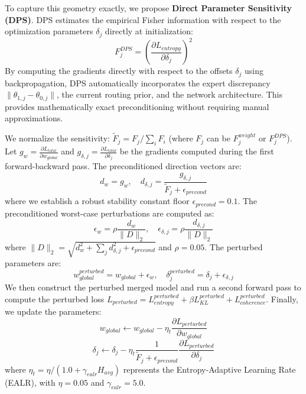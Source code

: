\documentclass{article}
\theoremstyle{plain}
\theoremstyle{definition}
\theoremstyle{remark}
\begin{document}
To capture this geometry exactly, we propose \textbf{Direct Parameter Sensitivity (DPS)}. DPS estimates the empirical Fisher information with respect to the optimization parameters $\delta_j$ directly at initialization:
\begin{equation}
  F^{DPS}_j = \left( \frac{\partial L_{entropy}}{\partial \delta_j} \right)^2
\end{equation}
By computing the gradients directly with respect to the offsets $\delta_j$ using backpropagation, DPS automatically incorporates the expert discrepancy $\|\theta_{1, j} - \theta_{0, j}\|$, the current routing prior, and the network architecture. This provides mathematically exact preconditioning without requiring manual approximations.

We normalize the sensitivity: $\tilde{F}_j = F_j / \sum_i F_i$ (where $F_j$ can be $F^{weight}_j$ or $F^{DPS}_j$). Let $g_w = \frac{\partial L_{total}}{\partial w_{global}}$ and $g_{\delta, j} = \frac{\partial L_{total}}{\partial \delta_j}$ be the gradients computed during the first forward-backward pass. The preconditioned direction vectors are:
\begin{equation}
  d_w = g_w, \quad d_{\delta, j} = \frac{g_{\delta, j}}{\tilde{F}_j + \epsilon_{precond}}
\end{equation}
where we establish a robust stability constant floor $\epsilon_{precond} = 0.1$. The preconditioned worst-case perturbations are computed as:
\begin{equation}
  \epsilon_w = \rho \frac{d_w}{\|D\|_2}, \quad \epsilon_{\delta, j} = \rho \frac{d_{\delta, j}}{\|D\|_2}
\end{equation}
where $\|D\|_2 = \sqrt{d_w^2 + \sum_j d_{\delta, j}^2 + \epsilon_{precond}}$ and $\rho = 0.05$. The perturbed parameters are:
\begin{equation}
  w_{global}^{perturbed} = w_{global} + \epsilon_w, \quad \delta_j^{perturbed} = \delta_j + \epsilon_{\delta, j}
\end{equation}
We then construct the perturbed merged model and run a second forward pass to compute the perturbed loss $L_{perturbed} = L_{entropy}^{perturbed} + \beta L_{KL}^{perturbed} + L_{coherence}^{perturbed}$. Finally, we update the parameters:
\begin{equation}
  w_{global} \leftarrow w_{global} - \eta_t \frac{\partial L_{perturbed}}{\partial w_{global}}
\end{equation}
\begin{equation}
  \delta_j \leftarrow \delta_j - \eta_t \frac{1}{\tilde{F}_j + \epsilon_{precond}} \frac{\partial L_{perturbed}}{\partial \delta_j}
\end{equation}
where $\eta_t = \eta / (1.0 + \gamma_{ealr} H_{avg})$ represents the Entropy-Adaptive Learning Rate (EALR), with $\eta = 0.05$ and $\gamma_{ealr} = 5.0$.
\end{document}
